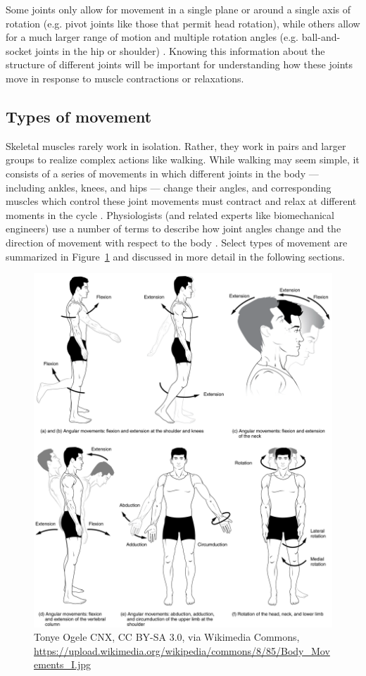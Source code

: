 \documentclass{article}
\begin{document}
Some joints only allow for movement in a single plane or around a single axis of rotation (e.g. pivot joints like those that permit head rotation), while others allow for a much larger range of motion and multiple rotation angles (e.g. ball-and-socket joints in the hip or shoulder) \citep{openStax_joints}. Knowing this information about the structure of different joints will be important for understanding how these joints move in response to muscle contractions or relaxations.

\subsection{Types of movement}

Skeletal muscles rarely work in isolation. Rather, they work in pairs and larger groups to realize complex actions like walking. While walking may seem simple, it consists of a series of movements in which different joints in the body --- including ankles, knees, and hips --- change their angles, and corresponding muscles which control these joint movements must contract and relax at different moments in the cycle \citep{musculoskeletal}. Physiologists (and related experts like biomechanical engineers) use a number of terms to describe how joint angles change and the direction of movement with respect to the body \citep{openStax_movements}. Select types of movement are summarized in Figure~\ref{quLOxq4fuy} and discussed in more detail in the following sections.

\begin{figure}[!htbp]
\centering
\includegraphics[width=0.7\linewidth]{files/EPpXta8zJdzN048lz8AR-865f73da41ea97aee2290807c3e391e5.png}
\caption[]{Tonye Ogele CNX, CC BY-SA 3.0, via Wikimedia Commons, \href{https://upload.wikimedia.org/wikipedia/commons/8/85/Body\_Movements\_I.jpg}{https://upload.wikimedia.org/wikipedia/commons/8/85/Body\_Movements\_I.jpg}}
\label{quLOxq4fuy}
\end{figure}
\end{document}
